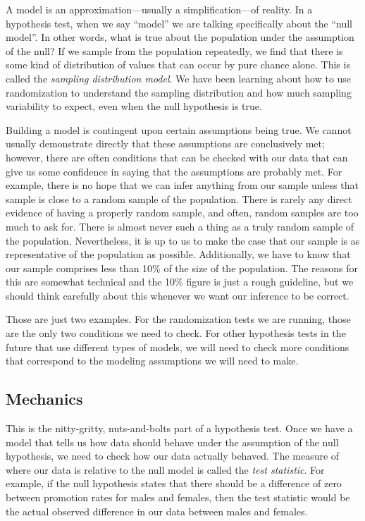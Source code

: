 \documentclass[
]{book}
\begin{document}
A model is an approximation---usually a simplification---of reality. In a hypothesis test, when we say ``model'' we are talking specifically about the ``null model''. In other words, what is true about the population under the assumption of the null? If we sample from the population repeatedly, we find that there is some kind of distribution of values that can occur by pure chance alone. This is called the \emph{sampling distribution model}. We have been learning about how to use randomization to understand the sampling distribution and how much sampling variability to expect, even when the null hypothesis is true.

Building a model is contingent upon certain assumptions being true. We cannot usually demonstrate directly that these assumptions are conclusively met; however, there are often conditions that can be checked with our data that can give us some confidence in saying that the assumptions are probably met. For example, there is no hope that we can infer anything from our sample unless that sample is close to a random sample of the population. There is rarely any direct evidence of having a properly random sample, and often, random samples are too much to ask for. There is almost never such a thing as a truly random sample of the population. Nevertheless, it is up to us to make the case that our sample is as representative of the population as possible. Additionally, we have to know that our sample comprises less than 10\% of the size of the population. The reasons for this are somewhat technical and the 10\% figure is just a rough guideline, but we should think carefully about this whenever we want our inference to be correct.

Those are just two examples. For the randomization tests we are running, those are the only two conditions we need to check. For other hypothesis tests in the future that use different types of models, we will need to check more conditions that correspond to the modeling assumptions we will need to make.

\hypertarget{hypothesis1-mechanics}{%
\subsection{Mechanics}\label{hypothesis1-mechanics}}

This is the nitty-gritty, nuts-and-bolts part of a hypothesis test. Once we have a model that tells us how data should behave under the assumption of the null hypothesis, we need to check how our data actually behaved. The measure of where our data is relative to the null model is called the \emph{test statistic}. For example, if the null hypothesis states that there should be a difference of zero between promotion rates for males and females, then the test statistic would be the actual observed difference in our data between males and females.
\end{document}
